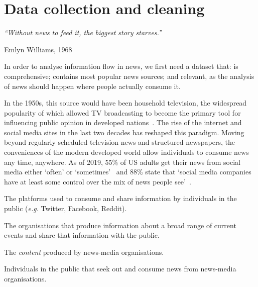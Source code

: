 \chapter{Data collection and cleaning}\label{ch:data}
\epigraph{\em ``Without news to feed it, the biggest story starves.''}{Emlyn Williams, 1968} %

In order to analyse information flow in news, we first need a dataset that: is comprehensive; contains most popular news sources; and relevant, as the analysis of news should happen where people actually consume it.

In the 1950s, this source would have been household television, the widespread popularity of which allowed TV broadcasting to become the primary tool for influencing public opinion in developed nations~\cite{abramson_electronic_1990}. 
The rise of the internet and social media sites in the last two decades has reshaped this paradigm. Moving beyond regularly scheduled television news and structured newspapers, the conveniences of the modern developed world allow individuals to consume news any time, anywhere. As of 2019, 55\% of US adults get their news from social media either `often' or `sometimes'~ and 88\% state that `social media companies have at least some control over the mix of news people see'~\cite{shearer_americans_2019}.

\begin{definition}
	The platforms used to consume and share information by individuals in the public (\emph{e.g.} Twitter, Facebook, Reddit).
\end{definition}

\begin{definition}
	The organisations that produce information about a broad range of current events and share that information with the public.
\end{definition}

\begin{definition}[News]
	The \emph{content} produced by news-media organisations. 
\end{definition}


\begin{definition}[Consumers]
	Individuals in the public that seek out and consume news from news-media organisations.
\end{definition}

